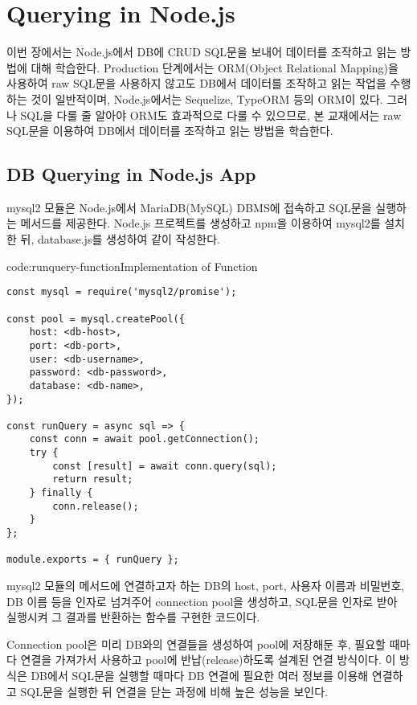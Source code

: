 \section{Querying in Node.js}\label{sect:querying-in-node-js}

이번 장에서는 Node.js에서 DB에 CRUD SQL문을 보내어 데이터를 조작하고 읽는 방법에 대해 학습한다. Production 단계에서는 ORM(Object Relational Mapping)을 사용하여 raw SQL문을 사용하지 않고도 DB에서 데이터를 조작하고 읽는 작업을 수행하는 것이 일반적이며, Node.js에서는 Sequelize, TypeORM 등의 ORM이 있다. 그러나 SQL을 다룰 줄 알아야 ORM도 효과적으로 다룰 수 있으므로, 본 교재에서는 raw SQL문을 이용하여 DB에서 데이터를 조작하고 읽는 방법을 학습한다.

\subsection*{DB Querying in Node.js App}

mysql2 모듈은 Node.js에서 MariaDB(MySQL) DBMS에 접속하고 SQL문을 실행하는 메서드를 제공한다. Node.js 프로젝트를 생성하고 npm을 이용하여 mysql2를 설치한 뒤, database.js를 생성하여 \과 같이 작성한다.

\begin{codeenv}{code:runquery-function}{Implementation of  Function}\begin{verbatim}
const mysql = require('mysql2/promise');

const pool = mysql.createPool({
    host: <db-host>,
    port: <db-port>,
    user: <db-username>,
    password: <db-password>,
    database: <db-name>,
});

const runQuery = async sql => {
    const conn = await pool.getConnection();
    try {
        const [result] = await conn.query(sql);
        return result;
    } finally {
        conn.release();
    }
};

module.exports = { runQuery };
\end{verbatim}
\end{codeenv}

\은 mysql2 모듈의  메서드에 연결하고자 하는 DB의 host, port, 사용자 이름과 비밀번호, DB 이름 등을 인자로 넘겨주어 connection pool을 생성하고, SQL문을 인자로 받아 실행시켜 그 결과를 반환하는  함수를 구현한 코드이다.

Connection pool은 미리 DB와의 연결들을 생성하여 pool에 저장해둔 후, 필요할 때마다 연결을 가져가서 사용하고  pool에 반납(release)하도록 설계된 연결 방식이다. 이 방식은 DB에서 SQL문을 실행할 때마다 DB 연결에 필요한 여러 정보를 이용해 연결하고 SQL문을 실행한 뒤 연결을 닫는 과정에 비해 높은 성능을 보인다.

